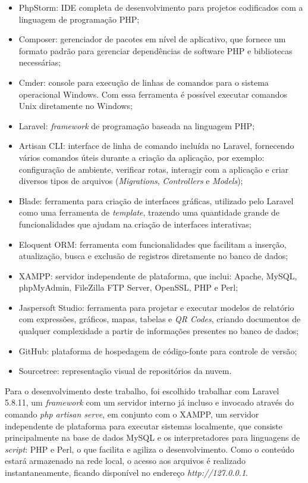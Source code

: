 \begin{itemize}
    \item PhpStorm: IDE completa de desenvolvimento para projetos codificados com a linguagem de programação PHP;
    \item Composer: gerenciador de pacotes em nível de aplicativo, que fornece um formato padrão para gerenciar dependências de software PHP e bibliotecas necessárias;
    \item Cmder: console para execução de linhas de comandos para o sistema operacional Windows. Com essa ferramenta é possível executar comandos Unix diretamente no Windows; %
    \item Laravel: \textit{framework} de programação baseada na linguagem PHP;
    \item Artisan CLI: interface de linha de comando incluída no Laravel, fornecendo vários comandos úteis durante a criação da aplicação, por exemplo: configuração de ambiente, verificar rotas, interagir com a aplicação e criar diversos tipos de arquivos (\textit{Migrations}, \textit{Controllers} e \textit{Models});
    \item Blade: ferramenta para criação de interfaces gráficas, utilizado pelo Laravel como uma ferramenta de \textit{template}, trazendo uma quantidade grande de funcionalidades que ajudam na criação de interfaces interativas;
    \item Eloquent ORM: ferramenta com funcionalidades que facilitam a inserção, atualização, busca e exclusão de registros diretamente no banco de dados;
    \item XAMPP: servidor independente de plataforma, que inclui: Apache, MySQL, phpMyAdmin, FileZilla FTP Server, OpenSSL, PHP e Perl;
    \item Jaspersoft Studio: ferramenta para projetar e executar modelos de relatório com expressões, gráficos, mapas, tabelas e \textit{QR Codes}, criando documentos de qualquer complexidade a partir de informações presentes no banco de dados;
    \item GitHub: plataforma de hospedagem de código-fonte para controle de versão;
    \item Sourcetree: representação visual de repositórios da nuvem.
\end{itemize}

\newpage
Para o desenvolvimento deste trabalho, foi escolhido trabalhar com Laravel 5.8.11, um \textit{framework} com um servidor interno já incluso e invocado através do comando \textit{php artisan serve}, em conjunto com o XAMPP, um servidor independente de plataforma para executar sistemas localmente, que consiste principalmente na base de dados MySQL e os interpretadores para linguagens de \textit{script}: PHP e Perl, o que facilita e agiliza o desenvolvimento. Como o conteúdo estará armazenado  na rede local, o acesso aos arquivos é realizado instantaneamente, ficando disponível no endereço \textit{http://127.0.0.1}.

